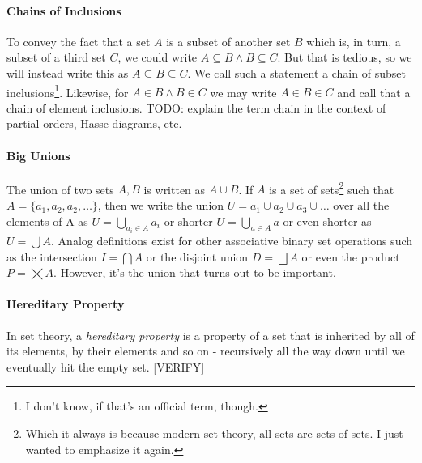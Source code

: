 \paragraph{Chains of Inclusions}
To convey the fact that a set $A$ is a subset of another set $B$ which is, in turn, a subset of a third set $C$, we could write $A \subseteq B \wedge B \subseteq C$. But that is tedious, so we will instead write this as $A \subseteq B \subseteq C$. We call such a statement a chain of subset inclusions\footnote{I don't know, if that's an official term, though.}. Likewise, for $A \in B \wedge B \in C$ we may write $A \in B \in C$ and call that a chain of element inclusions. TODO: explain the term chain in the context of partial orders, Hasse diagrams, etc.



\paragraph{Big Unions}
The union of two sets $A,B$ is written as $A \cup B$. If $A$ is a set of sets\footnote{Which it always is because modern set theory, all sets are sets of sets. I just wanted to emphasize it again.} such that $A = \{a_1, a_2, a_2, \ldots \}$, then we write the union $U = a_1 \cup a_2 \cup a_3 \cup \ldots$ over all the elements of A as $U = \bigcup_{a_i \in A} a_i$ or shorter $U = \bigcup_{a \in A} a$ or even shorter as $U = \bigcup A$. Analog definitions exist for other associative binary set operations such as the intersection $I = \bigcap A$ or the disjoint union $D = \bigsqcup A$ or even the product $P = \bigtimes A$. However, it's the union that turns out to be important. 

\paragraph{Hereditary Property}
In set theory, a \emph{hereditary property} is a property of a set that is inherited by all of its elements, by their elements and so on - recursively all the way down until we eventually hit the empty set. [VERIFY]


